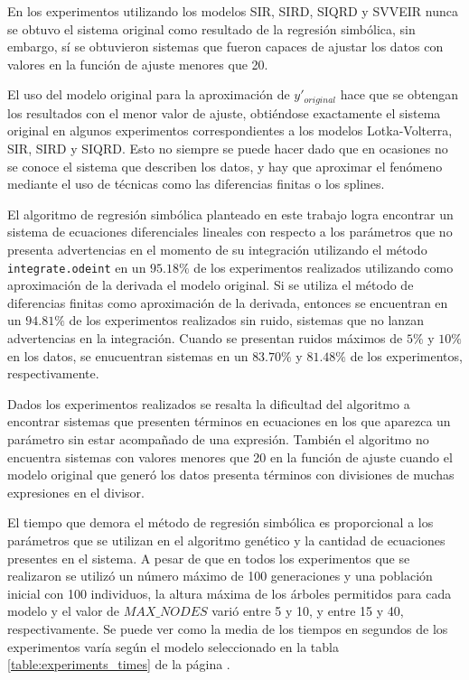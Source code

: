 En los experimentos utilizando los modelos SIR, SIRD, SIQRD y SVVEIR nunca se obtuvo el sistema original como resultado de la regresión simbólica, sin embargo, sí se obtuvieron sistemas que fueron capaces de ajustar los datos con valores en la función de ajuste menores que 20.

El uso del modelo original para la aproximación de $y'_{original}$ hace que se obtengan los resultados con el menor valor de ajuste, obtiéndose exactamente el sistema original en algunos experimentos correspondientes a los modelos Lotka-Volterra, SIR, SIRD y SIQRD. Esto no siempre se puede hacer dado que en ocasiones no se conoce el sistema que describen los datos, y hay que aproximar el fenómeno mediante el uso de técnicas como las diferencias finitas o los splines.

El algoritmo de regresión simbólica planteado en este trabajo logra encontrar un sistema de ecuaciones diferenciales lineales con respecto a los parámetros que no presenta advertencias en el momento de su integración utilizando el método \texttt{integrate.odeint} en un $95.18\%$ de los experimentos realizados utilizando como aproximación de la derivada el modelo original. Si se utiliza el método de diferencias finitas como aproximación de la derivada, entonces se encuentran en un $94.81\%$ de los experimentos realizados sin ruido, sistemas que no lanzan advertencias en la integración. Cuando se presentan ruidos máximos de $5\%$ y $10\%$ en los datos, se enucuentran sistemas en un $83.70\%$ y $81.48\%$ de los experimentos, respectivamente.

Dados los experimentos realizados se resalta la dificultad del algoritmo a encontrar sistemas que presenten términos en ecuaciones en los que aparezca un parámetro sin estar acompañado de una expresión. También el algoritmo no encuentra sistemas con valores menores que 20 en la función de ajuste cuando el modelo original que generó los datos presenta términos con divisiones de muchas expresiones en el divisor.

El tiempo que demora el método de regresión simbólica es proporcional a los parámetros que se utilizan en el algoritmo genético y la cantidad de ecuaciones presentes en el sistema. A pesar de que en todos los experimentos que se realizaron se utilizó un número máximo de 100 generaciones y una población inicial con 100 individuos, la altura máxima de los árboles permitidos para cada modelo y el valor de $MAX\_NODES$ varió entre 5 y 10, y entre 15 y 40, respectivamente. Se puede ver como la media de los tiempos en segundos de los experimentos varía según el modelo seleccionado en la tabla \ref{table:experiments_times} de la página \pageref{table:experiments_times}.

